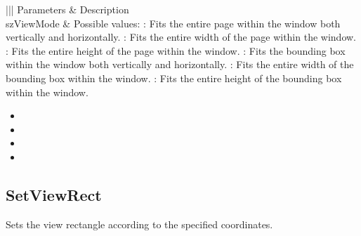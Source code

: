 \documentclass[letterpaper,12pt,english,openany,oneside]{sphinxmanual}
\begin{document}
\begin{savenotes}\sphinxattablestart
\centering
{}\label{\detokenize{IAC_API_OLE_Objects:section-106}}\nobreak
\begin{tabular}[t]{|||}
\hline
\sphinxstyletheadfamily 
Parameters
&\sphinxstyletheadfamily 
Description
\\
\hline
szViewMode
&
Possible values:  : Fits the entire page within the window both vertically and horizontally.  : Fits the entire width of the page within the window.  : Fits the entire height of the page within the window.  : Fits the bounding box within the window both vertically and horizontally.  : Fits the entire width of the bounding box within the window.  : Fits the entire height of the bounding box within the window.
\\
\hline
\end{tabular}
\par
\sphinxattableend\end{savenotes}
\label{\detokenize{IAC_API_OLE_Objects:related-methods-152}}
\begin{itemize}
\item {} 
 

\item {} 
 

\item {} 
 

\item {} 
 

\end{itemize}




\subsection{SetViewRect}
\label{\detokenize{IAC_API_OLE_Objects:setviewrect}}
Sets the view rectangle according to the specified coordinates.
\end{document}

